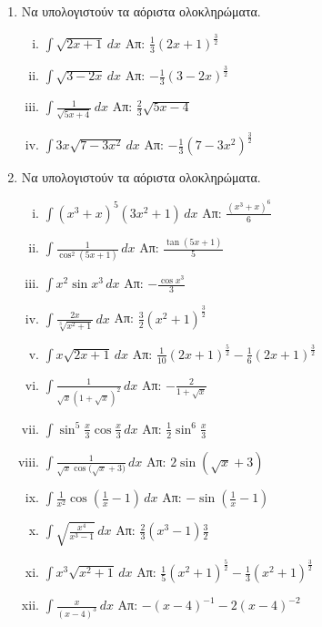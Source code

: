 \documentclass[a4paper,12pt]{article}
\begin{document}
\thispagestyle{empty}
\begin{center}
\end{center}
\vspace{\baselineskip}
\begin{enumerate}

\item Να υπολογιστούν τα αόριστα ολοκληρώματα.


\begin{enumerate}[i)]
	\item $ \int \sqrt{ 2x+1 } \,{dx} $ \hfill Απ: $ \frac{ 1 }{ 3 } (2x+1)^{\frac{ 3 }{ 2 }
		} $
	\item $ \int \sqrt{ 3-2x } \,{dx} $ \hfill Απ: $ - \frac{ 1}{ 3 }(3-2x)^{\frac{ 3 }{ 2
		}}  $
	\item $ \int \frac{1}{ \sqrt{ 5x+4 } } \,{dx} $ \hfill Απ: $ \frac{ 2 }{ 3 } \sqrt{ 5x-4 } $
	\item $ \int 3x \sqrt{ 7-3x^{2} } \,{dx} $ \hfill Απ: $ - \frac{1}{ 3 } (7-3x^{2})^{\frac{ 3
		}{ 2 }} $
\end{enumerate}

\item Να υπολογιστούν τα αόριστα ολοκληρώματα.

\begin{enumerate}[i)]
	\item $ \int (x^{3} + x)^{5}(3x^{2} + 1) \,{dx} $ \hfill Απ: $ \frac{ (x^{3} + x)^{6} }{ 6}  $
	\item $ \int \frac{ 1 }{ \cos^{2}{ (5x + 1)} } \,{dx} $ \hfill Απ: $ \frac{\tan{(5x+1)}}{5} $
	\item $ \int x^{2} \sin{x^{3}} \,{dx} $ \hfill Απ: $ - \frac{ \cos{x^{3}}}{ 3 }  $
	\item $ \int \frac{ 2x }{ \sqrt[3]{ x^{2}+ 1 }  } \,{dx} $ \hfill Απ: $ \frac{ 3 }{ 2 }
		(x^{2} + 1)^{\frac{ 3 }{ 2 }} $
	\item $ \int x \sqrt{ 2x+1 } \,{dx} $ \hfill Απ: $ \frac{1}{ 10 } (2x+1)^{\frac{ 5 }{ 2
		}} - \frac{1}{ 6 } (2x+1)^{\frac{ 3 }{ 2 }} $
	\item $ \int \frac{1}{ \sqrt{ x } (1 + \sqrt{ x })^{2} } \,{dx} $ \hfill Απ: $ - \frac{ 2
		}{ 1 + \sqrt{ x } } $
	\item $ \int \sin^{5}{\frac{ x }{ 3 } \cos{\frac{ x }{ 3 } }} \,{dx} $ \hfill Απ: $ \frac{1}{ 2 }
		\sin^{6}{\frac{ x }{ 3 }} $
	\item $ \int \frac{1}{ \sqrt{ x } \cos{(\sqrt{ x } + 3}) } \,{dx} $ \hfill Απ: $ 2 \sin{(\sqrt{
	x } + 3)} $
\item $ \int \frac{1}{ x^{2} } \cos{(\frac{1}{ x } - 1)} \,{dx} $ \hfill Απ: $ - \sin{(\frac{1}{
	x } -1)} $
\item $ \int \sqrt{ \frac{ x^{4} }{ x^{3} -1 }  }  \,{dx} $ \hfill Απ: $ \frac{ 2 }{ 3 } (x^{3} -
	1){\frac{ 3 }{ 2 }} $
\item $ \int x^{3} \sqrt{ x^{2} +1}  \,{dx} $ \hfill Απ: $ \frac{ 1 }{ 5 } (x^{2}+1)^{\frac{ 5
	}{ 2 }} - \frac{1}{ 3 } (x^{2} + 1)^{\frac{ 3 }{ 2 }}  $
\item $ \int \frac{ x }{ (x-4)^{3} } \,{dx} $ \hfill Απ: $ -(x-4)^{-1} - 2(x-4)^{-2} $
\end{enumerate}

\end{enumerate}
\end{document}

